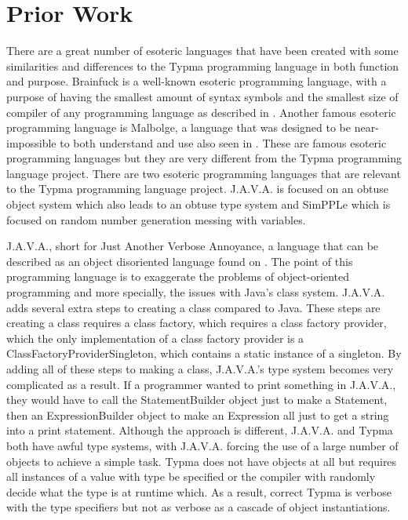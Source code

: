 \documentclass[10pt,twocolumn]{article}
\begin{document}
\section{Prior Work}

There are a great number of esoteric languages that have been created with some similarities and differences to the Typma programming language in both function and purpose. Brainfuck is a well-known esoteric programming language, with a purpose of having the smallest amount of syntax symbols and the smallest size of compiler of any programming language as described in \textcite{Morr2014Esoteric}. Another famous esoteric programming language is Malbolge, a language that was designed to be near-impossible to both understand and use also seen in \textcite{Morr2014Esoteric}. These are famous esoteric programming languages but they are very different from the Typma programming language project. There are two esoteric programming languages that are relevant to the Typma programming language project. J.A.V.A. is focused on an obtuse object system which also leads to an obtuse type system and SimPPLe which is focused on random number generation messing with variables.

J.A.V.A., short for Just Another Verbose Annoyance, a language that can be described as an object disoriented language found on \textcite{J.A.V.A.}. The point of this programming language is to exaggerate the problems of object-oriented programming and more specially, the issues with Java's class system. J.A.V.A. adds several extra steps to creating a class compared to Java. These steps are creating a class requires a class factory, which requires a class factory provider, which the only implementation of a class factory provider is a ClassFactoryProviderSingleton, which contains a static instance of a singleton. By adding all of these steps to making a class, J.A.V.A.'s type system becomes very complicated as a result. If a programmer wanted to print something in J.A.V.A., they would have to call the StatementBuilder object just to make a Statement, then an ExpressionBuilder object to make an Expression all just to get a string into a print statement. Although the approach is different, J.A.V.A. and Typma both have awful type systems, with J.A.V.A. forcing the use of a large number of objects to achieve a simple task. Typma does not have objects at all but requires all instances of a value with type be specified or the compiler with randomly decide what the type is at runtime which. As a result, correct Typma is verbose with the type specifiers but not as verbose as a cascade of object instantiations. 
\end{document}
